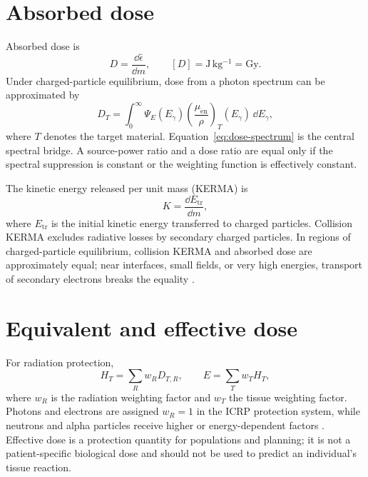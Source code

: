 \section{Absorbed dose}

Absorbed dose is
\begin{equation}
D=\frac{\dd\bar\epsilon}{\dd m},
\qquad [D]=\mathrm{J\,kg^{-1}}=\mathrm{Gy}.
\label{eq:dose-def}
\end{equation}
Under charged-particle equilibrium, dose from a photon spectrum can be approximated by
\begin{equation}
D_T
=\int_0^\infty
\Psi_E(E_\gamma)
\left(\frac{\mu_{\mathrm{en}}}{\rho}\right)_T(E_\gamma)
\,\dd E_\gamma,
\label{eq:dose-spectrum}
\end{equation}
where $T$ denotes the target material. Equation~\eqref{eq:dose-spectrum} is the central spectral bridge. A source-power ratio and a dose ratio are equal only if the spectral suppression is constant or the weighting function is effectively constant.

The kinetic energy released per unit mass (KERMA) is
\begin{equation}
K=\frac{\dd E_{\mathrm{tr}}}{\dd m},
\end{equation}
where $E_{\mathrm{tr}}$ is the initial kinetic energy transferred to charged particles. Collision KERMA excludes radiative losses by secondary charged particles. In regions of charged-particle equilibrium, collision KERMA and absorbed dose are approximately equal; near interfaces, small fields, or very high energies, transport of secondary electrons breaks the equality \cite{attix1986,icru85,icru90}.

\section{Equivalent and effective dose}

For radiation protection,
\begin{equation}
H_T=\sum_R w_R D_{T,R},
\qquad
E=\sum_Tw_TH_T,
\label{eq:effective-dose}
\end{equation}
where $w_R$ is the radiation weighting factor and $w_T$ the tissue weighting factor. Photons and electrons are assigned $w_R=1$ in the ICRP protection system, while neutrons and alpha particles receive higher or energy-dependent factors \cite{icrp103}. Effective dose is a protection quantity for populations and planning; it is not a patient-specific biological dose and should not be used to predict an individual's tissue reaction.

